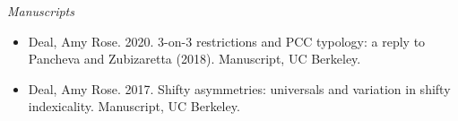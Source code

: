 

\noindent\emph{Manuscripts}

\begin{itemize}

\item Deal, Amy Rose. 2020. 3-on-3 restrictions and PCC typology: a reply to Pancheva and Zubizaretta (2018). Manuscript, UC Berkeley.

\item Deal, Amy Rose. 2017. Shifty asymmetries: universals and variation in shifty indexicality. Manuscript, UC Berkeley.

\end{itemize}

